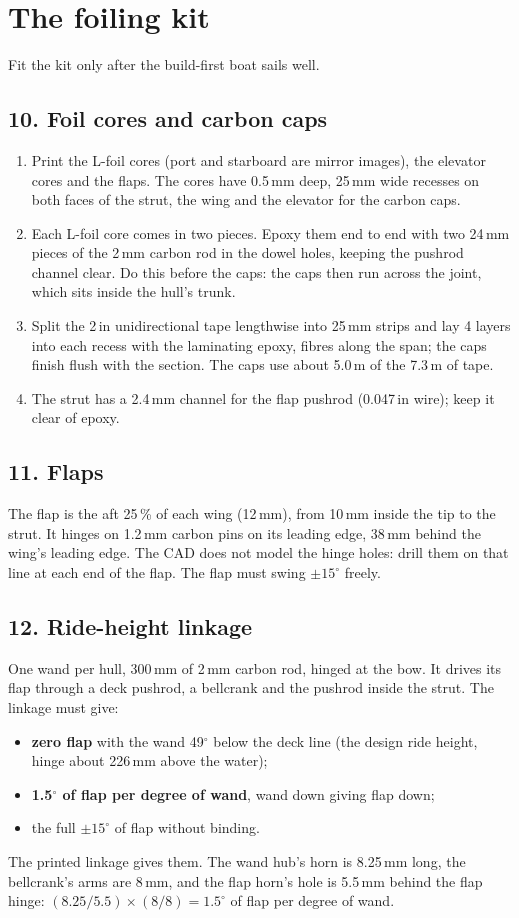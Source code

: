 \documentclass[11pt]{article}
\newcommand{\step}[1]{\subsection*{#1}}
\begin{document}
\section{The foiling kit}
Fit the kit only after the build-first boat sails well.
\step{10. Foil cores and carbon caps}
\begin{enumerate}
\item Print the L-foil cores (port and starboard are mirror images), the elevator cores and the flaps. The cores have 0.5\,mm deep, 25\,mm wide recesses on both faces of the strut, the wing and the elevator for the carbon caps.
\item Each L-foil core comes in two pieces. Epoxy them end to end with two 24\,mm pieces of the 2\,mm carbon rod in the dowel holes, keeping the pushrod channel clear. Do this before the caps: the caps then run across the joint, which sits inside the hull's trunk.
\item Split the 2\,in unidirectional tape lengthwise into 25\,mm strips and lay 4 layers into each recess with the laminating epoxy, fibres along the span; the caps finish flush with the section. The caps use about 5.0\,m of the 7.3\,m of tape.
\item The strut has a 2.4\,mm channel for the flap pushrod (0.047\,in wire); keep it clear of epoxy.
\end{enumerate}
\step{11. Flaps}
The flap is the aft 25\,\% of each wing (12\,mm), from 10\,mm inside the tip to the strut. It hinges on 1.2\,mm carbon pins on its leading edge, 38\,mm behind the wing's leading edge. The CAD does not model the hinge holes: drill them on that line at each end of the flap. The flap must swing $\pm15^\circ$ freely.
\step{12. Ride-height linkage}
One wand per hull, 300\,mm of 2\,mm carbon rod, hinged at the bow. It drives its flap through a deck pushrod, a bellcrank and the pushrod inside the strut. The linkage must give:
\begin{itemize}
\item \textbf{zero flap} with the wand 49$^\circ$ below the deck line (the design ride height, hinge about 226\,mm above the water);
\item \textbf{1.5$^\circ$ of flap per degree of wand}, wand down giving flap down;
\item the full $\pm15^\circ$ of flap without binding.
\end{itemize}
The printed linkage gives them. The wand hub's horn is 8.25\,mm long, the bellcrank's arms are 8\,mm, and the flap horn's hole is 5.5\,mm behind the flap hinge: $(8.25/5.5)\times(8/8) = 1.5^\circ$ of flap per degree of wand.
\end{document}
